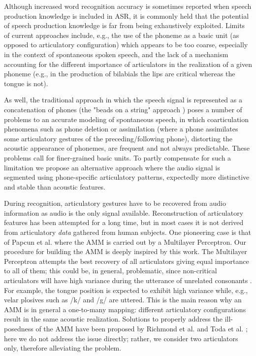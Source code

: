 \documentclass[10pt]{article}
\begin{document}
Although increased word recognition accuracy is sometimes reported when speech production
knowledge is included in ASR, it is commonly held that the potential of speech production
knowledge is far from being exhaustively exploited. Limits of current approaches include, e.g.,
the use of the phoneme as a basic unit (as opposed to articulatory configuration)
which appears to be too coarse, especially in the context of spontaneous spoken speech,
and the lack of a mechanism accounting for the different importance of articulators in the
realization of a given phoneme (e.g., in the production of bilabials the lips are critical whereas
the tongue is not).

As well, the traditional approach in which the speech signal is represented as a concatenation of phones 
(the "beads on a string" approach \cite{ostendorf}) poses a number of problems to an accurate modeling of
spontaneous speech, in which coarticulation phenomena such as phone deletion or assimilation (where a phone assimilates some articulatory gestures of the preceding/following phone),
distorting the acoustic appearance of phonemes, are frequent and not always predictable. These problems
call for finer-grained basic units. To partly compensate for such a limitation we propose
an alternative approach where the audio signal is segmented using phone-specific articulatory patterns,
expectedly more distinctive and stable than acoustic features.

During recognition, articulatory gestures have to be recovered 
from audio information as audio is the only signal available.
Reconstruction of articulatory features has been attempted for a long
time, but in most cases it is not derived from articulatory \emph{data}
gathered from human subjects. One pioneering case is that of Papcun
et al. \cite{papcun} where the AMM is carried out by a Multilayer Perceptron.
Our procedure for building the AMM is deeply inspired by this work.
The Multilayer Perceptron attempts the best recovery of all articulators giving equal importance
to all of them; this could be, in general, problematic, since non-critical articulators will have
high variance during the utterance of unrelated consonants \cite{papcun,rose}.
For example, the tongue position is expected to exhibit high variance while, e.g., velar plosives
such as /k/ and /g/ are uttered. This is the main reason why an AMM is in general a one-to-many mapping: different articulatory configurations result in the same acoustic realization. Solutions to properly address the ill-posedness
of the AMM have been proposed by Richmond et al. \cite{richmond} and Toda et al. \cite{toda}; here we do
not address the issue directly; rather, we consider two articulators only, therefore alleviating the problem.
\end{document}
